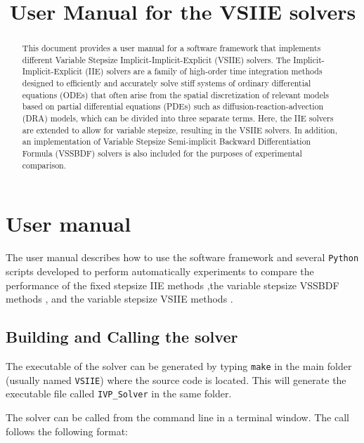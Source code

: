 \documentclass[preprint,1p]{article}
\begin{document}
%

\title{ \bf User Manual for the VSIIE solvers}

\maketitle 

\begin{abstract}

This document provides a user manual for a software framework 
that implements different Variable Stepsize Implicit-Implicit-Explicit (VSIIE) solvers.
The Implicit-Implicit-Explicit (IIE) solvers \cite{MARABEH2023} are a family of high-order time integration methods designed
to efficiently and accurately solve stiff systems of ordinary differential equations (ODEs) that often
arise from the spatial discretization of relevant models based on partial differential equations (PDEs)
such as diffusion-reaction-advection (DRA) models, which can be divided into three separate terms.
Here, the IIE solvers are extended to allow for variable stepsize, resulting in the VSIIE solvers.
In addition, an implementation of Variable Stepsize Semi-implicit Backward Differentiation Formula (VSSBDF) solvers 
 \cite{MARABEH2025} is also included for the purposes of experimental comparison.

\end{abstract}


\section{User manual}

The user manual describes how to use the software framework and several \texttt{Python} scripts 
developed to perform automatically experiments to compare the performance of the 
fixed stepsize IIE  methods \cite{MARABEH2023},the  variable stepsize VSSBDF methods \cite{MARABEH2025}, and the variable stepsize 
VSIIE  methods \cite{MARABEH2026}.

\subsection{Building and Calling the solver}

The executable of the solver can be generated by typing {\tt make} in the main folder (usually named {\tt VSIIE}) 
where the source code is located.  This will generate the executable file called {\tt IVP\_Solver} in the same folder.

The solver can be called from the command line in a terminal window.  The call follows the following format:
\end{document}
